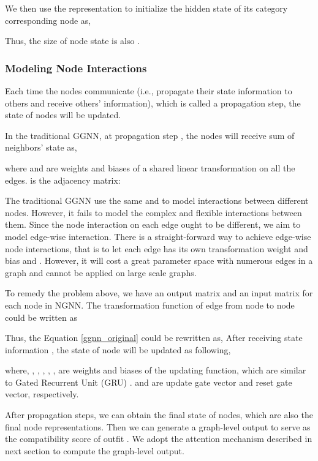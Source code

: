 \documentclass[sigconf]{acmart}
\begin{document}
 We then use the representation to initialize the hidden state
  of its category corresponding node  as,

Thus, the size of node state is also .


\subsubsection{Modeling Node Interactions}


Each time the nodes communicate (i.e., propagate their state information to others and receive others' information), which is called a propagation step, the state of nodes will be updated.


In the traditional GGNN, at propagation step , the nodes will receive sum of neighbors' state as,
 
where  and  are weights and biases of a shared linear transformation on all the edges.  is the adjacency matrix:

The traditional GGNN use the same  and  to model interactions between different nodes.
 However, it fails to model the complex and flexible interactions between them.
Since the node interaction on each edge ought to be different, we aim to model edge-wise interaction. There is a straight-forward way to achieve edge-wise node interactions, that is to let each edge has its own transformation weight and bias  and . However, it will cost a great parameter space with numerous edges in a graph and cannot be applied on large scale graphs.

 To remedy the problem above, we have an output matrix  and an input matrix  for each node  in NGNN. The transformation function of edge  from node  to node  could be written as

Thus, the Equation \ref{ggnn_original} could be rewritten as, 
After receiving state information , the state of node  will be updated as following,


where, , , , , ,  are weights and biases of the updating function, which are similar to Gated Recurrent Unit (GRU) \cite{li2015gated}.  and  are update gate vector and reset gate vector, respectively.


After  propagation steps, we can obtain the final state of nodes, which are also the final node representations.
Then we can generate a graph-level output to serve as the compatibility score  of outfit . We adopt the attention mechanism described in next section to compute the graph-level output.
\end{document}
